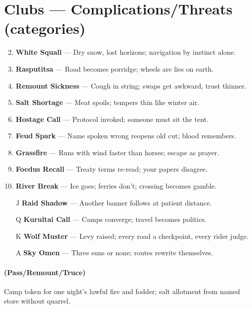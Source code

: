 \section*{Clubs --- Complications/Threats (categories)}
\label{sec:ykrul-complications}
\begin{enumerate}
\setcounter{enumi}{1}
\item \textbf{White Squall} --- Dry snow, lost horizons; navigation by instinct alone.
\item \textbf{Rasputitsa} --- Road becomes porridge; wheels are lies on earth.
\item \textbf{Remount Sickness} --- Cough in string; swaps get awkward, trust thinner.
\item \textbf{Salt Shortage} --- Meat spoils; tempers thin like winter air.
\item \textbf{Hostage Call} --- Protocol invoked; someone must sit the tent.
\item \textbf{Feud Spark} --- Name spoken wrong reopens old cut; blood remembers.
\item \textbf{Grassfire} --- Runs with wind faster than horses; escape as prayer.
\item \textbf{Foedus Recall} --- Treaty terms re-read; your papers disagree.
\item \textbf{River Break} --- Ice goes; ferries don't; crossing becomes gamble.
\item[J] \textbf{Raid Shadow} --- Another banner follows at patient distance.
\item[Q] \textbf{Kurultai Call} --- Camps converge; travel becomes politics.
\item[K] \textbf{Wolf Muster} --- Levy raised; every road a checkpoint, every rider judge.
\item[A] \textbf{Sky Omen} --- Three suns or none; routes rewrite themselves.
\end{enumerate}

\paragraph*{(Pass/Remount/Truce)} Camp token for one night's lawful fire and fodder; salt allotment from named store without quarrel.

